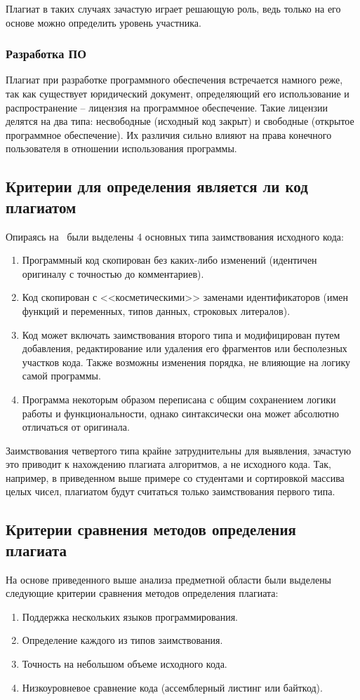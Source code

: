 Плагиат в таких случаях зачастую играет решающую роль, ведь только на его основе можно определить уровень участника.

\subsubsection{Разработка ПО}
Плагиат при разработке программного обеспечения встречается намного реже, так как существует юридический документ, определяющий  его использование и распространение -- лицензия на программное обеспечение. Такие лицензии делятся на два типа: несвободные (исходный код закрыт) и свободные (открытое программное обеспечение). Их различия сильно влияют на права конечного пользователя в отношении использования программы.

\subsection{Критерии для определения является ли код плагиатом}
Опираясь на~\cite{treb} были выделены 4 основных типа заимствования исходного кода: 
 \begin{enumerate}
 	\item Программный код скопирован без каких-либо изменений (идентичен оригиналу с точностью до комментариев).
 	\item Код скопирован с <<косметическими>> заменами идентификаторов (имен функций и переменных, типов данных, строковых литералов).
 	\item Код может включать заимствования второго типа и модифицирован путем добавления, редактирование или удаления его фрагментов или бесполезных участков кода. Также возможны изменения порядка, не влияющие на логику самой программы.
 	\item Программа некоторым образом переписана с общим сохранением логики работы и функциональности, однако синтаксически она может абсолютно отличаться от оригинала.
 \end{enumerate}

Заимствования четвертого типа крайне затруднительны для выявления, зачастую это приводит к нахождению плагиата алгоритмов, а не исходного кода. Так, например, в приведенном выше примере со студентами и сортировкой массива целых чисел, плагиатом будут считаться только заимствования первого типа.

\subsection{Критерии сравнения методов определения плагиата}
На основе приведенного выше анализа предметной области были выделены следующие критерии сравнения методов определения плагиата:
\begin{enumerate}
	\item Поддержка нескольких языков программирования.
	\item Определение каждого из типов заимствования.
	\item Точность на небольшом объеме исходного кода. 
	\item Низкоуровневое сравнение кода (ассемблерный листинг или байткод).
\end{enumerate}
\pagebreak